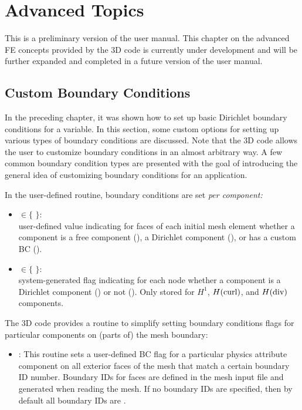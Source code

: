 %
%

\chapter{Advanced Topics}
\label{chap:advanced}


This is a preliminary version of the user manual. This chapter on the advanced FE concepts provided by the \hp3D code is currently under development and will be further expanded and completed in a future version of the user manual.

\section{Custom Boundary Conditions}
\label{sec:advanced-BC}

In the preceding chapter, it was shown how to set up basic Dirichlet boundary conditions for a variable. In this section, some custom options for setting up various types of boundary conditions are discussed. Note that the \hp3D code allows the user to customize boundary conditions in an almost arbitrary way. A few common boundary condition types are presented with the goal of introducing the general idea of customizing boundary conditions for an application.

In the user-defined  routine, boundary conditions are set \emph{per component:}
\begin{itemize}
	\item{
	 $\in \{$  $\}$:\\
	user-defined value indicating for faces of each initial mesh element  whether a component is a free component (), a Dirichlet component (), or has a custom BC ().
	} \item{
	 $\in \{$  $\}$:\\
	system-generated flag indicating for each node  whether a component is a Dirichlet component () or not (). Only stored for $H^1$, $H(\text{curl})$, and $H(\text{div})$ components.
	}
\end{itemize}
The \hp3D code provides a routine to simplify setting boundary conditions flags for particular components on (parts of) the mesh boundary:
\begin{itemize}
	\item{
		: This routine sets a user-defined BC flag for a particular physics attribute component on all exterior faces of the mesh that match a certain boundary ID number. Boundary IDs for faces are defined in the mesh input file and generated when reading the mesh. If no boundary IDs are specified, then by default all boundary IDs are .
	}
\end{itemize}

